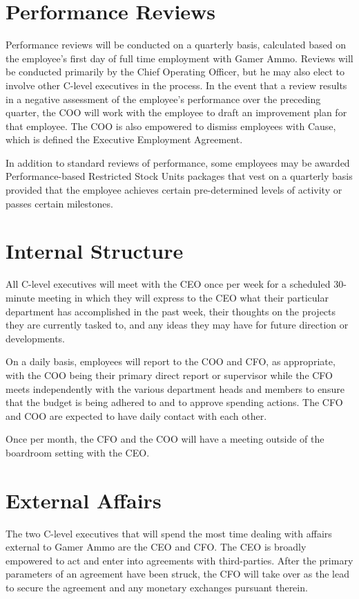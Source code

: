 \documentclass[11pt]{report}
\begin{document}
\section{Performance Reviews}
Performance reviews will be conducted on a quarterly basis, calculated based on the employee's first day of full time employment with Gamer Ammo. Reviews will be conducted primarily by the Chief Operating Officer, but he may also elect to involve other C-level executives in the process. In the event that a review results in a negative assessment of the employee's performance over the preceding quarter, the COO will work with the employee to draft an improvement plan for that employee. The COO is also empowered to dismiss employees with Cause, which is defined the Executive Employment Agreement.

In addition to standard reviews of performance, some employees may be awarded Performance-based Restricted Stock Units packages that vest on a quarterly basis provided that the employee achieves certain pre-determined levels of activity or passes certain milestones.

\section{Internal Structure}
All C-level executives will meet with the CEO once per week for a scheduled 30-minute meeting in which they will express to the CEO what their particular department has accomplished in the past week, their thoughts on the projects they are currently tasked to, and any ideas they may have for future direction or developments.

On a daily basis, employees will report to the COO and CFO, as appropriate, with the COO being their primary direct report or supervisor while the CFO meets independently with the various department heads and members to ensure that the budget is being adhered to and to approve spending actions. The CFO and COO are expected to have daily contact with each other.

Once per month, the CFO and the COO will have a meeting outside of the boardroom setting with the CEO.
\section{External Affairs}
The two C-level executives that will spend the most time dealing with affairs external to Gamer Ammo are the CEO and CFO. The CEO is broadly empowered to act and enter into agreements with third-parties. After the primary parameters of an agreement have been struck, the CFO will take over as the lead to secure the agreement and any monetary exchanges pursuant therein.
\end{document}
